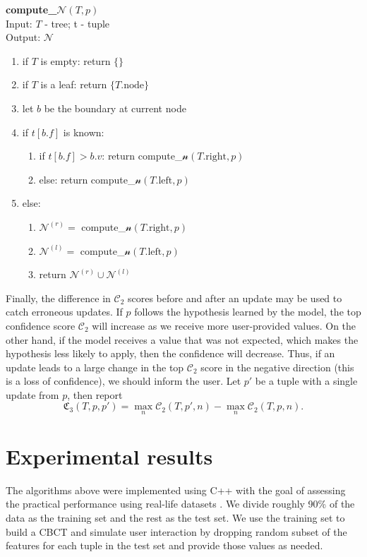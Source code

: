 \documentclass[conference]{IEEEtran}
\begin{document}
\begin{algorithm}
\textbf{compute\_$\mathcal{N}(T,p)$}\\
Input: $T$ - tree; t - tuple \\
Output: $\mathcal{N}$
\begin{enumerate}
	\item if $T$ is empty: return $\{ \}$
	\item if $T$ is a leaf: return $\{ T.\text{node} \}$
	\item let $b$ be the boundary at current node
	\item if $t[b.f]$ is known:
	\begin{enumerate}
		\item if $t[b.f] > b.v$: return compute\_$\mathcal{n}(T.\text{right},p)$
		\item else: return compute\_$\mathcal{n}(T.\text{left},p)$
	\end{enumerate}
	\item else:
	\begin{enumerate}
		\item $\mathcal{N}^{(r)} =$ compute\_$\mathcal{n}(T.\text{right},p)$
		\item $\mathcal{N}^{(l)} =$ compute\_$\mathcal{n}(T.\text{left},p)$
		\item return $\mathcal{N}^{(r)} \cup \mathcal{N}^{(l)}$
	\end{enumerate}
\end{enumerate}
\end{algorithm}

Finally, the difference in $\mathcal{C}_2$ scores before and after an update
may be used to catch erroneous updates. If $p$ follows the hypothesis
learned by the model, the top confidence score $\mathcal{C}_2$ will
increase as we receive more user-provided values. On the other hand,
if the model receives a value that was not expected, which makes the
hypothesis less likely to apply, then the confidence will decrease. Thus,
if an update leads to a large change in the top $\mathcal{C}_2$ score in
the negative direction (this is a loss of confidence), we should inform the user. 
Let $p'$ be a tuple with a single update from $p$, then report
$$ \mathfrak{C_3}(T,p,p') = \max_n \mathcal{C}_2 (T,p',n) -
	\max_n \mathcal{C}_2(T,p,n).$$

\section{Experimental results}
The algorithms above were implemented using C++ with the goal of
assessing the practical performance using real-life datasets \cite{b5}.
We divide roughly 90\% of the data as the training
set and the rest as the test set. We use the training set to build a CBCT and
simulate user interaction by dropping random subset of the features for each
tuple in the test set and provide those values as needed.
\end{document}
